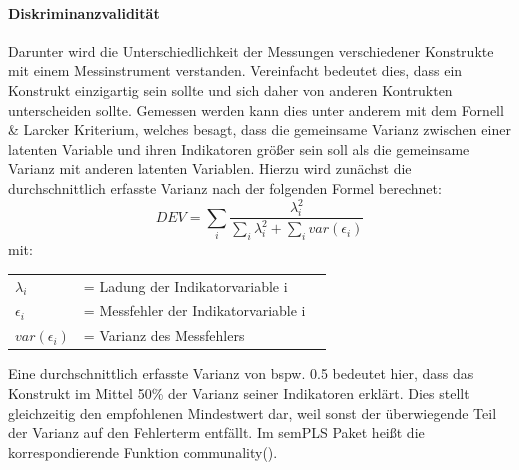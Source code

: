 \documentclass{article}\usepackage[]{graphicx}\usepackage[]{color}
\begin{document}
\paragraph{Diskriminanzvalidität} 

Darunter wird die Unterschiedlichkeit der Messungen verschiedener Konstrukte mit einem Messinstrument verstanden. Vereinfacht bedeutet dies, dass ein Konstrukt einzigartig sein sollte und sich daher von anderen Kontrukten unterscheiden sollte. Gemessen werden kann dies unter anderem mit dem Fornell \& Larcker Kriterium\cite{fornell1981structural}, welches besagt, dass die gemeinsame Varianz zwischen einer latenten Variable und ihren Indikatoren größer sein soll als die gemeinsame Varianz mit anderen latenten Variablen. Hierzu wird zunächst die durchschnittlich erfasste Varianz nach der folgenden Formel berechnet:
\begin{equation}
DEV = \sum_{i}^{}\frac{\lambda_{i}^{2}}{\sum_{i}^{}\lambda_{i}^{2}+\sum_{i}^{}var(\epsilon_{i})}
\end{equation}
mit:\\
\begin{tabular}{lll}
$\lambda_{i}$  &= Ladung der Indikatorvariable i\\
$\epsilon_{i}$ &= Messfehler der Indikatorvariable i\\
$var(\epsilon_{i})$ &= Varianz des Messfehlers\\
\end{tabular}
Eine durchschnittlich erfasste Varianz von bspw. 0.5 bedeutet hier, dass das Konstrukt im Mittel 50\% der Varianz seiner Indikatoren erklärt. Dies stellt gleichzeitig den empfohlenen Mindestwert dar, weil sonst der überwiegende Teil der Varianz auf den Fehlerterm entfällt.\cite{homburg1996konzeptualisierung,rodgers2003developing}
Im semPLS Paket heißt die korrespondierende Funktion communality().
\end{document}
